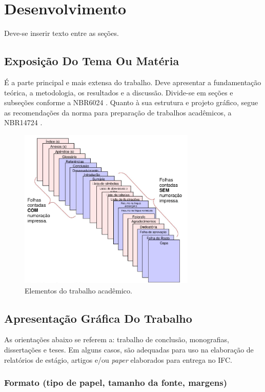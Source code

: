 \chapter{Desenvolvimento}

Deve-se inserir texto entre as seções.

\section{Exposição Do Tema Ou Matéria}

É a parte principal e mais extensa do trabalho. Deve apresentar a fundamentação teórica, a metodologia, os resultados e a discussão. Divide-se em seções e subseções conforme a NBR6024 \cite{abnt6024}. 
Quanto à sua estrutura e projeto gráfico, segue as recomendações da norma para preparação de trabalhos acadêmicos, a NBR14724 \cite{abnt14724}.

\begin{figure}[!ht]
    \centering
    \caption{Elementos do trabalho acadêmico.}   \label{fig:fig1}
    \includegraphics[width = 0.75\textwidth]{images/___fig1.png}
\end{figure}

\section{Apresentação Gráfica Do Trabalho}
As orientações abaixo se referem a: trabalho de conclusão, monografias, dissertações e teses. Em alguns casos, são adequadas para uso na elaboração de relatórios de estágio, artigos e/ou \textit{paper} elaborados para entrega no IFC.


\subsection{Formato (tipo de papel, tamanho da fonte, margens)}


